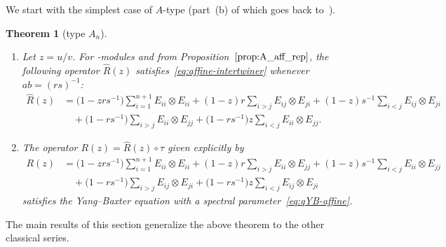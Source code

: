\documentclass[pdftex]{sigma}
\numberwithin{equation}{section}
\newtheorem{Theorem}{Theorem}[section]
\newcommand{\ssl}{\mathfrak{sl}}
\begin{document}
We start with the simplest case of $A$-type (part~(b) of which goes back to~\cite[Section~2]{JL2}).

\begin{Theorem}[type $A_{n}$]\label{thm:A_AffRMatrix}\quad
\begin{enumerate}
\item[$(a)$] Let $z=u/v$. For \smash{$U_{r,s}\bigl(\widehat{\ssl}_{n+1}\bigr)$}-modules  and  from Proposition~$\ref{prop:A_aff_rep}$, the following operator $\hat{R}(z)$ satisfies~\eqref{eq:affine-intertwiner} whenever $ab = (rs)^{-1}$:
\begin{align}
 \hat{R}(z) &=
 \bigl(1 -zrs^{-1}\bigr)\sum_{i = 1}^{n + 1} E_{ii} \otimes E_{ii} + (1 - z)r\sum_{i > j} E_{ij} \otimes E_{ji} +
 (1 - z)s^{-1}\sum_{i < j}E_{ij} \otimes E_{ji} \nonumber\\
 & \quad + \bigl(1 - rs^{-1}\bigr)\sum_{i > j}E_{ii} \otimes E_{jj} +
 \bigl(1 - rs^{-1}\bigr)z\sum_{i < j}E_{ii} \otimes E_{jj}.\label{eq:A_AffRMatrix}
\end{align}


\item[$(b)$] The operator $R(z)=\hat{R}(z)\circ \tau$ given explicitly by
\begin{displaymath}
\begin{split}
 R(z) &=
 \bigl(1 -zrs^{-1}\bigr)\sum_{i = 1}^{n + 1} E_{ii} \otimes E_{ii} + (1 - z)r\sum_{i > j} E_{ii} \otimes E_{jj} +
 (1 - z)s^{-1}\sum_{i < j} E_{ii} \otimes E_{jj} \\
 & \quad + \bigl(1 - rs^{-1}\bigr)\sum_{i > j} E_{ij} \otimes E_{ji} +
 \bigl(1 - rs^{-1}\bigr)z\sum_{i < j} E_{ij} \otimes E_{ji}
\end{split}
\end{displaymath}
satisfies the Yang--Baxter equation with a spectral parameter~\eqref{eq:qYB-affine}.
\end{enumerate}
\end{Theorem}

The main results of this section generalize the above theorem to the other classical series.
\end{document}
